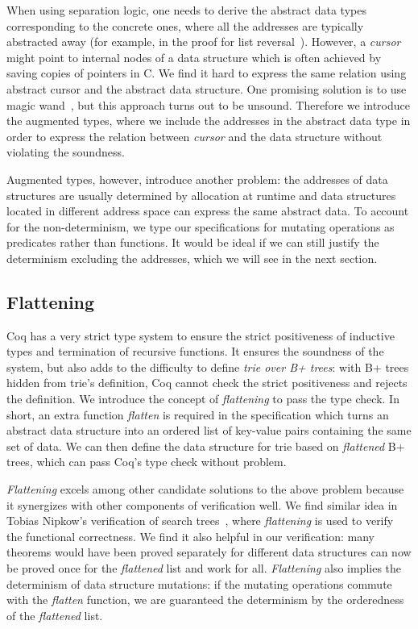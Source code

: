 \documentclass[sigplan,review,anonymous]{acmart}\settopmatter{printfolios=true,printccs=false,printacmref=false}
\begin{document}
When using separation logic, one needs to derive the abstract data types
corresponding to the concrete ones, where all the addresses are typically
abstracted away (for example, in the proof for list reversal~\cite{reynolds}).
However, a \textit{cursor} might point to internal nodes of a data structure
which is often achieved by saving copies of pointers in C. We find it hard to
express the same relation using abstract cursor and the abstract data structure.
One promising solution is to use magic wand~\cite{wand}, but this approach turns
out to be unsound. Therefore we introduce the augmented types, where we include
the addresses in the abstract data type in order to express the relation between
\textit{cursor} and the data structure without violating the soundness.

Augmented types, however, introduce another problem: the addresses of data
structures are usually determined by allocation at runtime and data structures
located in different address space can express the same abstract data. To
account for the non-determinism, we type our specifications for mutating
operations as predicates rather than functions. It would be ideal if we can
still justify the determinism excluding the addresses, which we will see in the
next section.

\subsection{Flattening}

Coq has a very strict type system to ensure the strict positiveness of
inductive types and termination of recursive functions. It ensures the soundness
of the system, but also adds to the difficulty to define \textit{trie over B+
  trees}: with B+ trees hidden from trie's definition, Coq cannot check the strict
positiveness and rejects the definition. We introduce the concept of
\textit{flattening} to pass the type check. In short, an extra function
\textit{flatten} is required in the specification which turns an abstract data
structure into an ordered list of key-value pairs containing the same set of
data. We can then define the data structure for trie based on \textit{flattened}
B+ trees, which can pass Coq's type check without problem.

\textit{Flattening} excels among other candidate solutions to the above problem
because it synergizes with other components of verification well. We find
similar idea in Tobias Nipkow's verification of search trees~\cite{nipkow},
where \textit{flattening} is used to verify the functional correctness. We find
it also helpful in our verification: many theorems would have been proved
separately for different data structures can now be proved once for the
\textit{flattened} list and work for all. \textit{Flattening} also implies the
determinism of data structure mutations: if the mutating operations commute with
the \textit{flatten} function, we are guaranteed the determinism by the
orderedness of the \textit{flattened} list.
\end{document}
